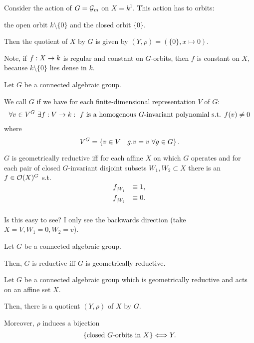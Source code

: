 \begin{example}
	Consider the action of $G = \mathcal{G}_m$ on $X = k^1$. This action has to orbits:
	
	the open orbit $k \setminus \{0\}$ and the closed orbit $\{0\}$.
	
	Then the quotient of $X$ by $G$ is given by $(Y,\rho) = (\{0\}, x \mapsto 0)$.
	
	Note, if $f : X \overset{}{\rightarrow} k$ is regular and constant on $G$-orbits, then $f$ is constant on $X$, because $k \setminus \{0\}$ lies dense in $k$.
\end{example}
\begin{definition}
Let $G$ be a connected algebraic group.

We call $G$  if we have for each finite-dimensional representation $V$ of $G$:
\begin{align*}
\forall v \in V^G ~ \exists f : V \overset{}{\rightarrow} k :~ f \text{ is a homogenous }G\text{-invariant polynomial s.t. }f(v) \neq 0
\end{align*}
where
\[V^G = \left\lbrace v\in V ~ | ~ g.v = v ~\forall g \in G\right\rbrace. \]
\end{definition}
\begin{remark}
	$G$ is geometrically reductive iff for each affine $X$ on which $G$ operates and for each pair of closed $G$-invariant disjoint subsets $W_1, W_2 \subset X$ there is an $f \in \mathcal{O}(X)^G$ s.t.
	\begin{align*}
	f_{|W_1} &\equiv 1,\\
	f_{|W_2} &\equiv 0.\\
	\end{align*}
	
	
	Is this easy to see? I only see the backwards direction (take $X = V, W_1 =0, W_2 = v$).
\end{remark}

\begin{theorem}
	Let $G$ be a connected algebraic group. 
	
	Then, $G$ is reductive iff $G$ is geometrically reductive.
\end{theorem}

\begin{theorem}
	Let $G$ be a connected algebraic group which is geometrically reductive and acts on an affine set $X$.
	
	Then, there is a quotient $(Y, \rho)$ of $X$ by $G$.
	
	Moreover, $\rho$ induces a bijection
	\[ \left\lbrace \text{closed }G\text{-orbits in }X \right\rbrace \Longleftrightarrow Y. \]
\end{theorem}

